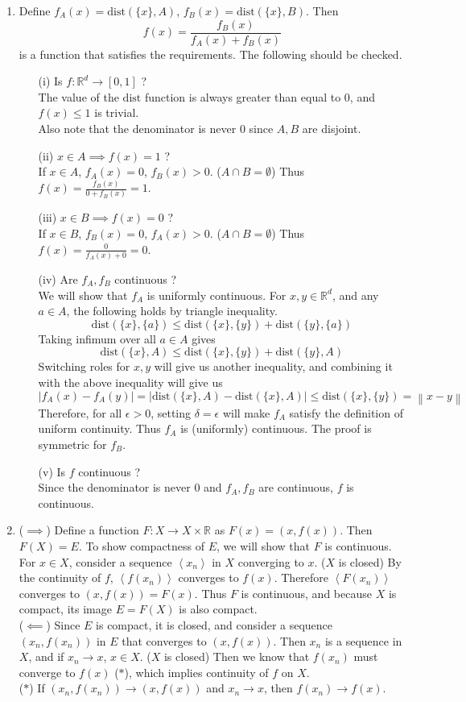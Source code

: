 \documentclass[11pt]{report}
\newcommand{\norm}[1]{\left\lVert#1\right\rVert}
\renewcommand{\span}[1]{\left\langle #1 \right\rangle}
\newcommand{\ra}{\rightarrow}
\newcommand{\abs}[1]{\left|#1\right|}
\newcommand{\imp}{\implies}
\newcommand{\dist}{\text{dist}}
\newcommand{\mimp}{$\implies$}
\newcommand{\R}{\mathbb{R}}
\begin{document}
\begin{enumerate}
\item Define $f_A(x) = \dist(\{x\}, A)$, $f_B(x) = \dist(\{x\}, B)$. Then $$f(x) = \frac{f_B(x)}{f_A(x) + f_B(x)}$$
is a function that satisfies the requirements. The following should be checked.
\begin{enumerate}
	\item[(i)] Is $f: \R^d \ra [0, 1]$ ?\\
	The value of the $\dist$ function is always greater than equal to 0, and $f(x) \leq 1$ is trivial.\\
	Also note that the denominator is never $0$ since $A, B$ are disjoint.
	\item[(ii)] $x\in A \imp f(x) = 1$ ?\\
	If $x\in A$, $f_A(x) = 0$, $f_B(x) > 0$. ($A\cap B = \emptyset$) Thus $f(x) = \frac{f_B(x)}{0+f_B(x)} = 1$.
	\item[(iii)] $x\in B \imp f(x) = 0$ ?\\
	If $x\in B$, $f_B(x) = 0$, $f_A(x) > 0$. ($A\cap B = \emptyset$) Thus $f(x) = \frac{0}{f_A(x)+0} = 0$.
	\item[(iv)] Are $f_A, f_B$ continuous ?\\
	We will show that $f_A$ is uniformly continuous. For $x, y\in \R^d$, and any $a\in A$, the following holds by triangle inequality.
	$$\dist(\{x\}, \{a\}) \leq \dist(\{x\}, \{y\}) + \dist(\{y\}, \{a\})$$
	Taking infimum over all $a\in A$ gives
	$$\dist(\{x\}, A) \leq \dist(\{x\}, \{y\}) + \dist(\{y\}, A)$$
	Switching roles for $x, y$ will give us another inequality, and combining it with the above inequality will give us
	$$\abs{f_A(x)-f_A(y)} = \abs{\dist(\{x\}, A) - \dist(\{x\}, A)} \leq \dist(\{x\}, \{y\}) = \norm{x - y}$$
	Therefore, for all $\epsilon > 0$, setting $\delta = \epsilon$ will make $f_A$ satisfy the definition of uniform continuity. Thus $f_A$ is (uniformly) continuous.	The proof is symmetric for $f_B$.
	\item[(v)] Is $f$ continuous ?\\
	Since the denominator is never 0 and $f_A, f_B$ are continuous, $f$ is continuous.
\end{enumerate}

\item (\mimp) Define a function $F:X\ra X\times \R$ as $F(x) = (x, f(x))$. Then $F(X) = E$. To show compactness of $E$, we will show that $F$ is continuous.\\
For $x\in X$, consider a sequence $\span{x_n}$ in $X$ converging to $x$. ($X$ is closed) By the continuity of $f$, $\span{f(x_n)}$ converges to $f(x)$. Therefore $\span{F(x_n)}$ converges to $(x, f(x)) = F(x)$. Thus $F$ is continuous, and because $X$ is compact, its image $E=F(X)$ is also compact.\\
($\impliedby$) Since $E$ is compact, it is closed, and consider a sequence $(x_n, f(x_n))$ in $E$ that converges to $(x, f(x))$. Then $x_n$ is a sequence in $X$, and if $x_n \ra x$, $x\in X$. ($X$ is closed) Then we know that $f(x_n)$ must converge to $f(x)$ ($*$), which implies continuity of $f$ on $X$.
\\
($*$) If $(x_n, f(x_n))\ra (x, f(x))$ and $x_n\ra x$, then $f(x_n)\ra f(x)$.


\end{enumerate}
\end{document}
